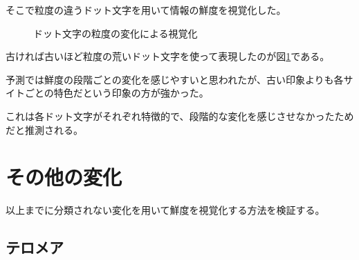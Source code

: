 そこで粒度の違うドット文字を用いて情報の鮮度を視覚化した。

\begin{figure}[htbp]
  \begin{center}
  \end{center}
  \caption{ドット文字の粒度の変化による視覚化}
  \label{fig:ver_dot}
\end{figure}

古ければ古いほど粒度の荒いドット文字を使って表現したのが図\ref{fig:ver_dot}である。

予測では鮮度の段階ごとの変化を感じやすいと思われたが、古い印象よりも各サイトごとの特色だという印象の方が強かった。

これは各ドット文字がそれぞれ特徴的で、段階的な変化を感じさせなかったためだと推測される。

\section{その他の変化}
\label{sec:ver_other}

以上までに分類されない変化を用いて鮮度を視覚化する方法を検証する。

\subsection{テロメア}
\label{subsec:ver_oth_tlm}

